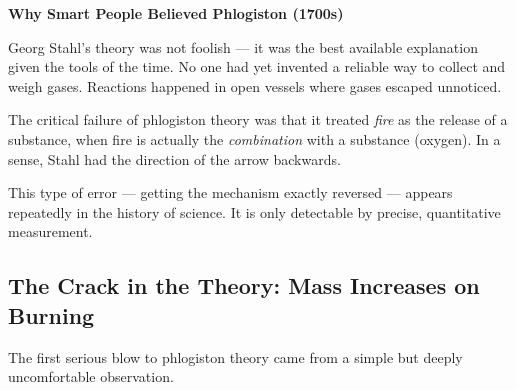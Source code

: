 \documentclass[12pt, a4paper]{book}
\theoremstyle{definition}
\begin{document}
\begin{historybox}
\textbf{Why Smart People Believed Phlogiston (1700s)}

Georg Stahl's theory was not foolish — it was the best available
explanation given the tools of the time.
No one had yet invented a reliable way to collect and weigh gases.
Reactions happened in open vessels where gases escaped unnoticed.

The critical failure of phlogiston theory was that it treated
\emph{fire} as the release of a substance,
when fire is actually the \emph{combination} with a substance (oxygen).
In a sense, Stahl had the direction of the arrow backwards.

This type of error — getting the mechanism exactly reversed —
appears repeatedly in the history of science.
It is only detectable by precise, quantitative measurement.
\end{historybox}

\subsection{The Crack in the Theory: Mass Increases on Burning}

The first serious blow to phlogiston theory came from a simple
but deeply uncomfortable observation.
\end{document}
